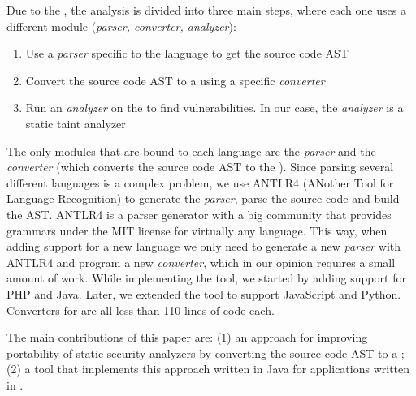 Due to the \astname{}, the analysis is divided into three main steps, where each one uses a different module (\textit{parser, converter, analyzer}):

\begin{enumerate}
    \item Use a \textit{parser} specific to the language to get the source code AST
    \item Convert the source code AST to a \astname{} using a specific \textit{converter}

    \item Run an \textit{analyzer} on the \astname{} to find vulnerabilities. In our case, the \textit{analyzer} is a static taint analyzer
\end{enumerate}

The only modules that are bound to each language are the \textit{parser} and the \textit{converter} (which converts the source code AST to the \astname{}). Since parsing several different languages is a complex problem, we use ANTLR4 (ANother Tool for Language Recognition) to generate the \textit{parser}, parse the source code and build the AST. ANTLR4 is a parser generator with a big community that provides grammars under the MIT license for virtually any language. This way, when adding support for a new language we only need to generate a new \textit{parser} with ANTLR4 and program a new \textit{converter}, which in our opinion requires a small amount of work. While implementing the \toolname{} tool, we started by adding support for PHP and Java. Later, we extended the tool to support JavaScript and Python. Converters for \implangs{} are all less than 110 lines of code each. 

The main contributions of this paper are: (1) an approach for improving portability of static security analyzers by converting the source code AST to a \astname{}; (2) a tool that implements this approach written in Java for applications written in \implangs{}.
